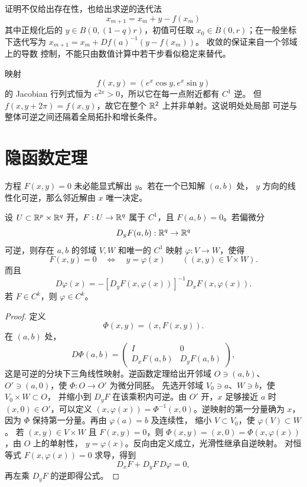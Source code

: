 证明不仅给出存在性，也给出求逆的迭代法
\[
 x_{m+1}=x_m+y-f(x_m)
\]
其中正规化后的 \(y\in B(0,(1-q)r)\)，初值可任取
\(x_0\in\overline B(0,r)\)；在一般坐标下迭代写为
\(x_{m+1}=x_m+Df(a)^{-1}(y-f(x_m))\)。
收敛的保证来自一个邻域上的导数
控制，不能只由数值计算中若干步看似稳定来替代。

\begin{example}
映射
\[
 f(x,y)=(e^x\cos y,e^x\sin y)
\]
的 Jacobian 行列式恒为 $e^{2x}>0$，所以它在每一点附近都有 $C^1$ 逆。
但 $f(x,y+2\pi)=f(x,y)$，故它在整个 $\mathbb{R}^2$ 上并非单射。这说明处处局部
可逆与整体可逆之间还隔着全局拓扑和增长条件。
\end{example}

\section{隐函数定理}

方程 $F(x,y)=0$ 未必能显式解出 $y$。若在一个已知解 $(a,b)$ 处，
$y$ 方向的线性化可逆，那么邻近解由 $x$ 唯一决定。

\begin{theorem}[隐函数定理]
\label{thm:finite-dimensional-implicit-function}
设 $U\subset\mathbb{R}^p\times\mathbb{R}^q$ 开，$F:U\to\mathbb{R}^q$ 属于 $C^1$，且
$F(a,b)=0$。若偏微分
\[
 D_yF(a,b):\mathbb{R}^q\to\mathbb{R}^q
\]
可逆，则存在 $a,b$ 的邻域 $V,W$ 和唯一的 $C^1$ 映射
$\varphi:V\to W$，使得
\[
 F(x,y)=0\quad\Longleftrightarrow\quad y=\varphi(x)
 \qquad((x,y)\in V\times W).
\]
而且
\[
 D\varphi(x)
 =-[D_yF(x,\varphi(x))]^{-1}D_xF(x,\varphi(x)).
\]
若 $F\in C^k$，则 $\varphi\in C^k$。
\end{theorem}

\begin{proof}
定义
\[
 \Phi(x,y)=(x,F(x,y)).
\]
在 $(a,b)$ 处，
\[
 D\Phi(a,b)=
 \begin{pmatrix}I&0\\D_xF(a,b)&D_yF(a,b)\end{pmatrix},
\]
这是可逆的分块下三角线性映射。逆函数定理给出开邻域
\(O\ni(a,b)\)、\(O'\ni(a,0)\)，使 \(\Phi:O\to O'\) 为微分同胚。
先选开邻域 \(V_0\ni a\)、\(W\ni b\)，使 \(V_0\times W\subset O\)，
并缩小到 \(D_yF\) 在该乘积内可逆。由 \(O'\) 开，\(x\) 足够接近
\(a\) 时 \((x,0)\in O'\)，可以定义
\((x,\varphi(x))=\Phi^{-1}(x,0)\)。逆映射的第一分量确为 \(x\)，
因为 \(\Phi\) 保持第一分量。再由 \(\varphi(a)=b\) 及连续性，
缩小 \(V\subset V_0\)，使 \(\varphi(V)\subset W\)。
若 \((x,y)\in V\times W\) 且 \(F(x,y)=0\)，则
\(\Phi(x,y)=(x,0)=\Phi(x,\varphi(x))\)，由 \(O\) 上的单射性，
\(y=\varphi(x)\)。反向由定义成立，光滑性继承自逆映射。
对恒等式 $F(x,\varphi(x))=0$ 求导，得到
\[
 D_xF+D_yF\,D\varphi=0,
\]
再左乘 $D_yF$ 的逆即得公式。
\end{proof}

